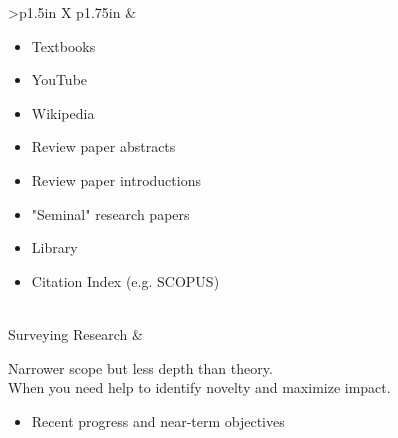 \documentclass[8pt]{extarticle}
\begin{document}
\begin{tabularx}{\linewidth}{>{\bfseries}p{1.5in} X p{1.75in}}
                                                            &   \begin{minipage}[t]{\linewidth}
                                                                \begin{itemize}[nosep,leftmargin=*]
                                                                    \item Textbooks
                                                                    \item YouTube
                                                                    \item Wikipedia
                                                                    \item Review paper abstracts
                                                                    \item Review paper introductions
                                                                    \item "Seminal" research papers
                                                                \end{itemize}
                                                                \vspace{1em}
                                                                \begin{itemize}[nosep,leftmargin=*]
                                                                    \item Library
                                                                    \item Citation Index (e.g. SCOPUS)
                                                                \end{itemize}
                                                                \end{minipage}
                                                                        \\
    \addlinespace
    Surveying Research          &   \begin{minipage}[t]{\linewidth}
                                    Narrower scope but less depth than theory. \\
                                    When you need help to identify novelty and maximize impact.
                                    \begin{itemize}[nosep]
                                        \item Recent progress and near-term objectives

\end{itemize}
\end{minipage}
\end{tabularx}
\end{document}
